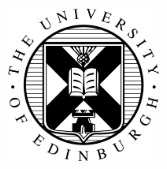 \begin{titlepage}
	\begin{addmargin}[-1cm]{-3cm}
    \begin{center}
        \large  

        \hfill

        \vfill

        \begingroup
            \color{Maroon}
            \\
            \color{Maroon}
            \\
            \color{Maroon}
            \\ \bigskip
        \endgroup

        \spacedlowsmallcaps{\myName}

        \vfill

        \includegraphics[width=4cm]{uoeMaterial/eushield-normal} \\ \medskip %
        \vfill

        \myDegree \\
        \myDepartment \\
        \myUni \\ \bigskip

        \myTime

        \vfill                      

    \end{center}  
  \end{addmargin}       
\end{titlepage}   

